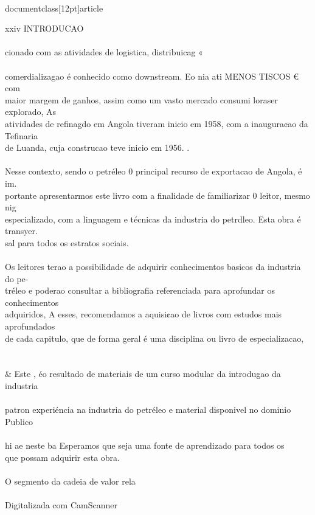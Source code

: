 \\documentclass[12pt]{article}
\begin{document}
{xxiv INTRODUCAO\\
\\
cionado com as atividades de logistica, distribuicag «\\
\\
comerdializagao é conhecido como downstream. Eo nia ati MENOS TISCOS € com\\
maior margem de ganhos, assim como um vasto mercado consumi loraser explorado, As\\
atividades de refinagdo em Angola tiveram inicio em 1958, com a inaugura¢ao da Tefinaria\\
de Luanda, cuja construcao teve inicio em 1956. .\\
\\
Nesse contexto, sendo o petréleo 0 principal recurso de exportacao de Angola, é im.\\
portante apresentarmos este livro com a finalidade de familiarizar 0 leitor, mesmo nig\\
especializado, com a linguagem e técnicas da industria do petrdleo. Esta obra é transyer.\\
sal para todos os estratos sociais.\\
\\
Os leitores terao a possibilidade de adquirir conhecimentos basicos da industria do pe-\\
tréleo e poderao consultar a bibliografia referenciada para aprofundar os conhecimentos\\
adquiridos, A esses, recomendamos a aquisi¢ao de livros com estudos mais aprofundados\\
de cada capitulo, que de forma geral é uma disciplina ou livro de especializacao,\\
\\
\\& Este , éo resultado de materiais de um curso modular da introdugao da industria\\
\\
patron experiéncia na industria do petréleo e material disponivel no dominio Publico\\
\\
hi ae neste ba Esperamos que seja uma fonte de aprendizado para todos os\\
que possam adquirir esta obra.\\
\\
O segmento da cadeia de valor rela\\
\\
Digitalizada com CamScanner\\

}
\end{document}
